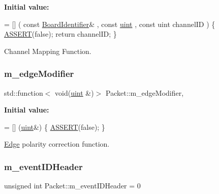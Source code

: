 {\bfseries Initial value\+:}
\begin{DoxyCode}
= [] (
    \textcolor{keyword}{const} \hyperlink{class_board_identifier}{BoardIdentifier}& ,
    \textcolor{keyword}{const} \hyperlink{namespacechlmap_a51093e4e5b1ccf24696e04d671728200}{uint} ,
    \textcolor{keyword}{const} uint channelID
) \{
    \hyperlink{_debug_8hpp_aca68c0d4ac8df0838e209fb5300f7be3}{ASSERT}(\textcolor{keyword}{false}); 
    \textcolor{keywordflow}{return} channelID;
\}
\end{DoxyCode}


Channel Mapping Function. 

\mbox{\label{class_packet_aa95ed5326667f67a5c2d101cd5a4afca}} 
\subsubsection{\texorpdfstring{m\+\_\+edge\+Modifier}{m\_edgeModifier}}
{\footnotesize\ttfamily std\+::function$<$ void(\hyperlink{_packet_8cpp_a69aa29b598b851b0640aa225a9e5d61d}{uint} \&)$>$ Packet\+::m\+\_\+edge\+Modifier\hspace{0.3cm}{\ttfamily [static]}, {\ttfamily [private]}}

{\bfseries Initial value\+:}
\begin{DoxyCode}
= [] (\hyperlink{_packet_8cpp_a69aa29b598b851b0640aa225a9e5d61d}{uint}&) \{
    \hyperlink{_debug_8hpp_aca68c0d4ac8df0838e209fb5300f7be3}{ASSERT}(\textcolor{keyword}{false}); 
\}
\end{DoxyCode}


\hyperlink{class_edge}{Edge} polarity correction function. 

\mbox{\label{class_packet_a3abf93570be0669506f39b391bc574ca}} 
\subsubsection{\texorpdfstring{m\+\_\+event\+I\+D\+Header}{m\_eventIDHeader}}
{\footnotesize\ttfamily unsigned int Packet\+::m\+\_\+event\+I\+D\+Header = 0\hspace{0.3cm}{\ttfamily [private]}}



